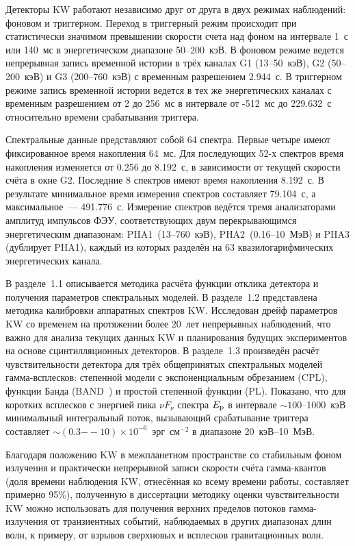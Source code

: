 Детекторы KW работают независимо друг от друга в двух режимах наблюдений: 
фоновом и триггерном. Переход в триггерный режим происходит при статистически 
значимом превышении скорости счета над фоном на интервале 1~с или 140~мс 
в энергетическом диапазоне 50--200~кэВ. В фоновом режиме ведется 
непрерывная запись временной истории в трёх каналах G1 (13--50~кэВ), G2 (50--200~кэВ) 
и G3 (200--760~кэВ) с временным разрешением 2.944~с. В триггерном режиме запись 
временной истории ведется в тех же энергетических каналах с временным разрешением 
от 2 до 256~мс в интервале от -512~мс до 229.632~с относительно времени срабатывания 
триггера.

Спектральные данные представляют собой 64 спектра. Первые четыре имеют фиксированное время накопления 64~мс.
Для последующих 52-х спектров время накопления изменяется от 0.256 до 8.192~с, 
в зависимости от текущей скорости счёта в окне G2. Последние 8 спектров имеют время накопления 8.192~с. 
В результате минимальное время измерения спектров составляет 79.104~с, а максимальное~--- 491.776~с.
Измерение спектров ведётся тремя анализаторами амплитуд импульсов ФЭУ, соответствующих
двум перекрывающимся энергетическим диапазонам:  
PHA1~(13--760~кэВ), PHA2~(0.16--10~МэВ) и PHA3 (дублирует PHA1), каждый из которых 
разделён на 63 квазилогарифмических энергетических канала.

В разделе~1.1 описывается методика расчёта функции отклика детектора и 
получения параметров спектральных моделей. В разделе~1.2 представлена методика калибровки 
аппаратных спектров KW. Исследован дрейф параметров KW со временем на протяжении 
более 20~лет непрерывных наблюдений, что важно для анализа текущих данных KW и 
планирования будущих экспериментов на основе сцинтилляционных детекторов.
В разделе~1.3 произведён расчёт чувствительности детектора для трёх общепринятых 
спектральных моделей гамма-всплесков: степенной модели с экспоненциальным обрезанием (CPL),
функции Банда (BAND~\citep{Band_1993ApJ}) и простой степенной функции (PL).
Показано, что для коротких всплесков с энергией пика $\nu F_{\nu}$ 
спектра $E_{\mathrm{p}}$ в интервале
$\sim 100$--1000~кэВ минимальный интегральный поток, вызывающий срабатывание триггера
составляет $\sim (0.3\mathrm{--}10) \times 10^{-6}$~эрг~см$^{-2}$ в диапазоне 20~кэВ--10~МэВ.

Благодаря положению KW в межпланетном пространстве со стабильным 
фоном излучения и практически непрерывной записи скорости счёта гамма-квантов 
(доля времени наблюдения KW, отнесённая ко всему времени работы, составляет 
примерно 95\%), полученную в диссертации методику оценки чувствительности KW
можно использовать для получения верхних пределов потоков гамма-излучения  
от транзиентных событий, наблюдаемых в других диапазонах длин волн, к примеру, 
от взрывов сверхновых и всплесков гравитационных волн.


